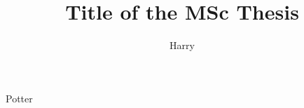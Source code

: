 



\usepackage[labelfont=bf]{caption}
\setlength{\columnsep}{0.7cm}


\raggedbottom %


\title[Subtitle]{Title of the MSc Thesis}
\author{Harry}{Potter}

\frontmatter




\printnomenclature
\listoffigures
\listoftables
\tableofcontents

\mainmatter
\thumbtrue
{}



\printbibliography[
heading=bibintoc,
title={Bibliography}
]

\appendix


